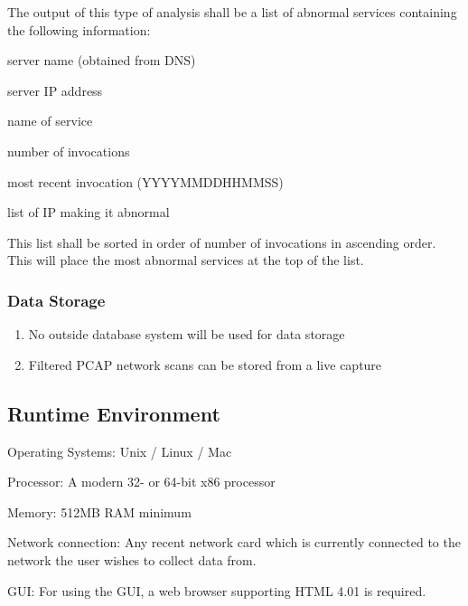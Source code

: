 \documentclass[titlepage]{article}
\begin{document}
The output of this type of analysis shall be a list of abnormal services
containing the following information:
\begin{itemize*}
    \item server name (obtained from DNS)
    \item server IP address
    \item name of service
    \item number of invocations
    \item most recent invocation (YYYYMMDDHHMMSS)
    \item list of IP making it abnormal
\end{itemize*}
This list shall be sorted in order of number of invocations in ascending order.
This will place the most abnormal services at the top of the list.


\subsubsection{Data Storage%
  \label{data-storage}%
}
  \begin{enumerate}
    \item No outside database system will be used for data storage
    \item Filtered PCAP network scans can be stored from a live capture
  \end{enumerate}


\subsection{Runtime Environment} 
\begin{itemize*}
    \item Operating Systems:  Unix / Linux / Mac
    \item Processor:  A modern 32- or 64-bit x86 processor
    \item Memory:  512MB RAM minimum
    \item Network connection:  Any recent network card which is currently connected to the network the user wishes to collect data from.
    \item GUI:  For using the GUI, a web browser supporting HTML 4.01 is required.
\end{itemize*}
\end{document}
